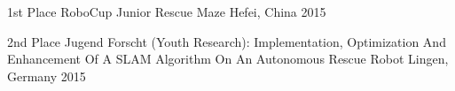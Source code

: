 

\begin{cvhonors}

  \cvhonor
    {1st Place} %
    {RoboCup Junior Rescue Maze} %
    {Hefei, China} %
    {2015} %


  \cvhonor
    {2nd Place} %
    {Jugend Forscht (Youth Research): Implementation, Optimization And Enhancement Of A SLAM Algorithm On An Autonomous Rescue Robot} %
    {Lingen, Germany} %
    {2015} %

\begin{comment}
  \cvhonor
    {1st Place} %
    {Dr. Hans Riegel Award: Development And Implementation Of An Algorithm For The Self-Localization Of An Autonomous Rescue Robot} %
    {Oldenburg, Germany} %
    {2014} %
\end{comment}
\end{cvhonors}
